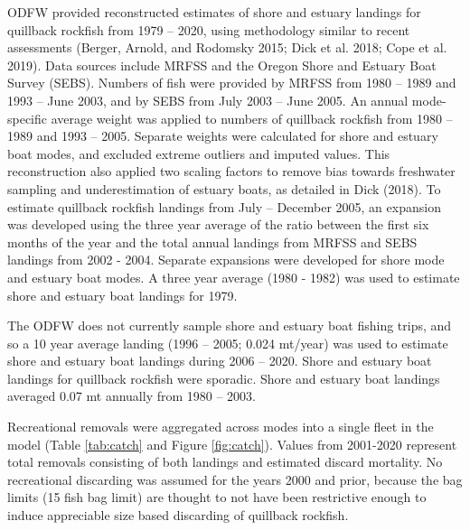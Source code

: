 \documentclass[11pt,
  english,
  a4paper,
]{article}
\begin{document}

ODFW provided reconstructed estimates of shore and estuary landings for quillback rockfish from 1979 -- 2020, using methodology similar to recent assessments {(Berger, Arnold, and Rodomsky 2015; Dick et al. 2018; Cope et al. 2019)\leavevmode\tagmcend\tagstructend}. Data sources include MRFSS and the Oregon Shore and Estuary Boat Survey (SEBS). Numbers of fish were provided by MRFSS from 1980 -- 1989 and 1993 -- June 2003, and by SEBS from July 2003 -- June 2005. An annual mode-specific average weight was applied to numbers of quillback rockfish from 1980 -- 1989 and 1993 -- 2005. Separate weights were calculated for shore and estuary boat modes, and excluded extreme outliers and imputed values. This reconstruction also applied two scaling factors to remove bias towards freshwater sampling and underestimation of estuary boats, as detailed in Dick {(2018)\leavevmode\tagmcend\tagstructend}. To estimate quillback rockfish landings from July -- December 2005, an expansion was developed using the three year average of the ratio between the first six months of the year and the total annual landings from MRFSS and SEBS landings from 2002 - 2004. Separate expansions were developed for shore mode and estuary boat modes. A three year average (1980 - 1982) was used to estimate shore and estuary boat landings for 1979.

\leavevmode\tagmcend\tagstructend\par


The ODFW does not currently sample shore and estuary boat fishing trips, and so a 10 year average landing (1996 -- 2005; 0.024 mt/year) was used to estimate shore and estuary boat landings during 2006 -- 2020. Shore and estuary boat landings for quillback rockfish were sporadic. Shore and estuary boat landings averaged 0.07 mt annually from 1980 -- 2003.

\leavevmode\tagmcend\tagstructend\par


Recreational removals were aggregated across modes into a single fleet in the model (Table \ref{tab:catch} and Figure \ref{fig:catch}). Values from 2001-2020 represent total removals consisting of both landings and estimated discard mortality. No recreational discarding was assumed for the years 2000 and prior, because the bag limits (15 fish bag limit) are thought to not have been restrictive enough to induce appreciable size based discarding of quillback rockfish.
\end{document}
